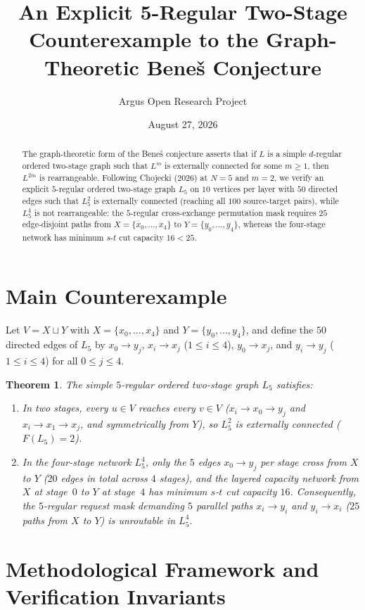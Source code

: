 \documentclass[10pt,reqno]{amsart}
\title[An Explicit 5-Regular Two-Stage Counterexample to the Bene\v{s} Conjecture]
{An Explicit 5-Regular Two-Stage Counterexample to the Graph-Theoretic Bene\v{s} Conjecture}
\author{Argus Open Research Project}
\date{August 27, 2026}
\newtheorem{theorem}{Theorem}[section]
\theoremstyle{definition}
\begin{document}
\begin{abstract}
The graph-theoretic form of the Bene\v{s} conjecture asserts that if $L$ is a simple $d$-regular ordered two-stage graph such that $L^m$ is externally connected for some $m\ge 1$, then $L^{2m}$ is rearrangeable. Following Chojecki (2026) at $N=5$ and $m=2$, we verify an explicit $5$-regular ordered two-stage graph $L_5$ on $10$ vertices per layer with $50$ directed edges such that $L_5^2$ is externally connected (reaching all $100$ source-target pairs), while $L_5^4$ is not rearrangeable: the $5$-regular cross-exchange permutation mask requires $25$ edge-disjoint paths from $X=\{x_0,\dots,x_4\}$ to $Y=\{y_0,\dots,y_4\}$, whereas the four-stage network has minimum $s$-$t$ cut capacity $16 < 25$.
\end{abstract}
\maketitle
\section{Main Counterexample}
Let $V = X\sqcup Y$ with $X=\{x_0,\dots,x_4\}$ and $Y=\{y_0,\dots,y_4\}$, and define the $50$ directed edges of $L_5$ by $x_0\to y_j$, $x_i\to x_j$ ($1\le i\le 4$), $y_0\to x_j$, and $y_i\to y_j$ ($1\le i\le 4$) for all $0\le j\le 4$.
\begin{theorem}
The simple $5$-regular ordered two-stage graph $L_5$ satisfies:
\begin{enumerate}[label=\textup{(\arabic*)}]
  \item In two stages, every $u\in V$ reaches every $v\in V$ ($x_i\to x_0\to y_j$ and $x_i\to x_1\to x_j$, and symmetrically from $Y$), so $L_5^2$ is externally connected ($F(L_5)=2$).
  \item In the four-stage network $L_5^4$, only the $5$ edges $x_0\to y_j$ per stage cross from $X$ to $Y$ ($20$ edges in total across $4$ stages), and the layered capacity network from $X$ at stage~$0$ to $Y$ at stage~$4$ has minimum $s$-$t$ cut capacity $16$. Consequently, the $5$-regular request mask demanding $5$ parallel paths $x_i\to y_i$ and $y_i\to x_i$ ($25$ paths from $X$ to $Y$) is unroutable in $L_5^4$.
\end{enumerate}
\end{theorem}

\section{Methodological Framework and Verification Invariants}
\end{document}
